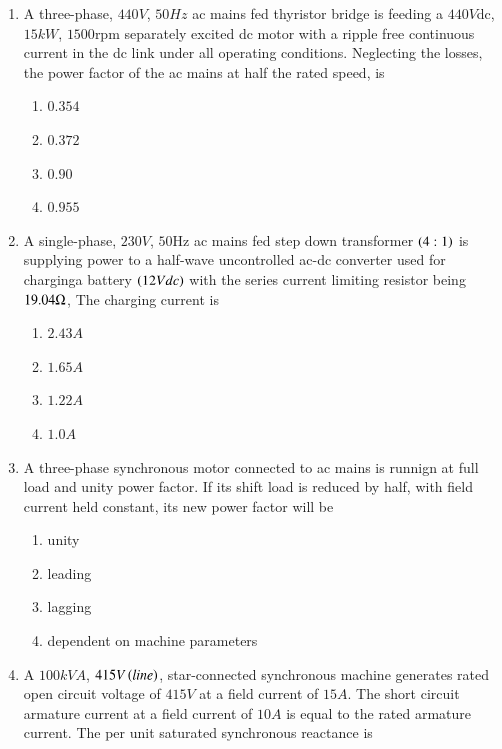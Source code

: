 \documentclass[journal,12pt,twocolumn]{IEEEtran}
\theoremstyle{remark}
\begin{document}
\begin{enumerate}
\begin{multicols}{2}
\begin{enumerate}
    \item $10Hz$
    \item $5Hz$
    \item $4Hz$
    \item $2Hz$
\end{enumerate}    
\end{multicols}
\item A three-phase, $440V$, $50Hz$ ac mains fed thyristor bridge is feeding a $440 V$dc, $15kW$, $1500$rpm separately excited dc motor with a ripple free continuous current in the dc link under all operating conditions. Neglecting the losses, the power factor of the ac mains at half the rated speed, is 
\begin{multicols}{2}
\begin{enumerate}
    \item $0.354$
    \item $0.372$
    \item $0.90$
    \item $0.955$
\end{enumerate}    
\end{multicols}
\item A single-phase, $230V$, $50$Hz ac mains fed step down transformer $\left(4:1\right)$ is supplying power to a half-wave uncontrolled ac-dc converter used for charginga battery $\left(12Vdc\right)$ with the series current limiting resistor being $19.04\ohm$, The charging current is
\begin{multicols}{2}
\begin{enumerate}
    \item $2.43A$
    \item $1.65A$
    \item $1.22A$
    \item $1.0A$
\end{enumerate}    
\end{multicols}
\item A three-phase synchronous motor connected to ac mains is runnign at full load and unity power factor. If its shift load is reduced by half, with field current held constant, its new power factor will be 
\begin{enumerate}
    \item unity
    \item leading
    \item lagging
    \item dependent on machine parameters
\end{enumerate}    
\item A $100kVA$, $415V\left(line\right)$, star-connected synchronous machine generates rated open circuit voltage of $415V$ at a field current of $15A$. The short circuit armature current at a field current of $10A$ is equal to the rated armature current. The per unit saturated synchronous reactance is 

\end{enumerate}
\end{document}
